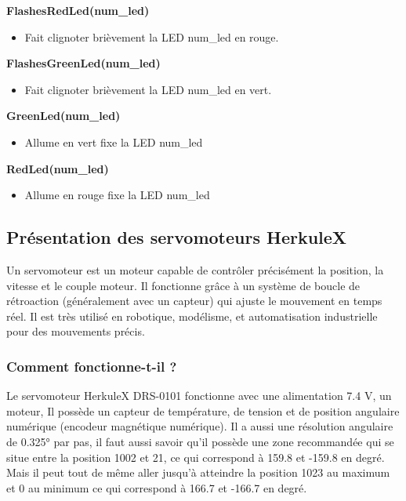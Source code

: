 \documentclass[main.tex]{subfiles}
\begin{document}
\textbf{FlashesRedLed(num\_led)}

\begin{itemize}
\item Fait clignoter brièvement la LED num\_led en rouge.
\end{itemize}

\textbf{FlashesGreenLed(num\_led)}

\begin{itemize}
\item Fait clignoter brièvement la LED num\_led en vert.
\end{itemize}

\textbf{GreenLed(num\_led)}

\begin{itemize}
\item Allume en vert fixe la LED num\_led
\end{itemize}

\textbf{RedLed(num\_led)}

\begin{itemize}
\item Allume en rouge fixe la LED num\_led
\end{itemize}


\subsection{Présentation des servomoteurs HerkuleX}

\quad Un servomoteur est un moteur capable de contrôler précisément la position, la vitesse et le couple moteur. Il fonctionne grâce à un système de boucle de rétroaction (généralement avec un capteur) qui ajuste le mouvement en temps réel. Il est très utilisé en robotique, modélisme, et automatisation industrielle pour des mouvements précis.

\subsubsection{Comment fonctionne-t-il ?}

Le servomoteur HerkuleX DRS-0101 fonctionne avec une alimentation 7.4 V, un moteur, Il possède un capteur de température, de tension et de position angulaire numérique (encodeur magnétique numérique). Il a aussi une résolution angulaire de 0.325° par pas, il faut aussi savoir qu’il possède une zone recommandée qui se situe entre la position 1002 et 21, ce qui correspond à 159.8 et -159.8 en degré. Mais il peut tout de même aller jusqu’à atteindre la position 1023 au maximum et 0 au minimum ce qui correspond à 166.7 et -166.7 en degré.
\end{document}
